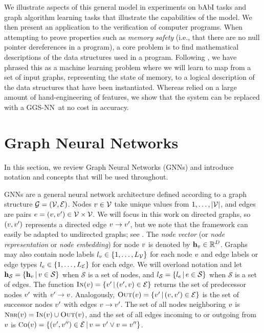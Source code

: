 \documentclass{article} %
\newcommand{\OurMethodShort}{GGS-NN}
\begin{document}
We illustrate aspects of this general model in experiments on bAbI tasks
\citep{weston2015towards} and graph algorithm
learning tasks that illustrate the capabilities of the model.
We then present an application to the verification of computer programs.
When attempting to prove properties such as \emph{memory safety} (i.e., that
there are no null pointer dereferences in a program), a core problem 
is to find mathematical descriptions of the data structures used in a program.
Following \cite{brockschmidt2015learning}, we have
phrased this as a machine learning problem where we will learn to map
from a set of input graphs, representing the state of memory, to a
logical description of the data structures that have been
instantiated.  Whereas \cite{brockschmidt2015learning} relied on a large amount of
hand-engineering of features, we show that the system can
be replaced with a \OurMethodShort~at no cost in accuracy.



\section{Graph Neural Networks}

In this section, we review Graph Neural Networks (GNNs)
\citep{gori2005new,scarselli2009graph} and introduce notation and concepts that will be
used throughout.

GNNs are a general neural network architecture defined according to a
graph structure $\mathcal{G} = (\mathcal{V}, \mathcal{E})$.  Nodes $v \in \mathcal{V}$
take unique values from $1, \ldots, |\mathcal{V}|$, and edges are pairs
$e = (v, v') \in \mathcal{V} \times \mathcal{V}$.  We will focus in this
work on directed graphs, so $(v, v')$ represents a directed
edge $v \rightarrow v'$, but we note that the framework can
easily be adapted to undirected graphs; see \cite{scarselli2009graph}.  The
\emph{node vector} (or \emph{node representation} or \emph{node
  embedding}) for node $v$ is denoted by $\mathbf{h}_{v} \in
\mathbb{R}^D$.  Graphs may also contain node labels $l_{v} \in \{1,
\ldots, L_{\mathcal{V}} \}$ for each node $v$ and edge labels or edge types
$l_{e} \in \{1, \ldots, L_{\mathcal{E}}\}$ for each edge.
We will overload notation and let 
 $\mathbf{h}_{\mathcal{S}} = \{ \mathbf{h}_{v} \,|\, v \in \mathcal{S} \}$
when $\mathcal{S}$ is a set of nodes, and
$l_{\mathcal{S}} = \{ l_{e} \,|\, e \in
\mathcal{S} \}$ when $\mathcal{S}$ is a set of edges.  The function
$\textsc{In}(v) = \{v' \,|\, (v', v) \in \mathcal{E}\}$ returns the
set of predecessor nodes $v'$ with $v' \rightarrow v$.
Analogously, $\textsc{Out}(v) = \{v' \,|\, (v, v') \in \mathcal{E}\}$ is the
set of successor nodes $v'$ with edges $v \rightarrow v'$.
The set of all nodes
neighboring $v$ is $\neighbor(\node) = \inc(\node) \cup
\out(\node)$, and the set of all edges incoming to or outgoing from
$v$ is 
$\co(\node) = \{(\node', \node'') \in \edges \given \node = \node' \lor \node = \node'' \}$.
\end{document}
